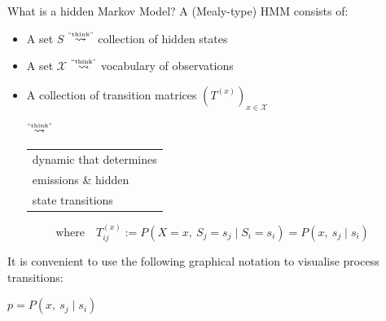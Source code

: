 \documentclass[aspectratio=169,11pt]{beamer}
\newcommand{\think}{\overset{\text{\tiny ``think''}}{\rightsquigarrow}}
\begin{document}
\begin{frame}{What is a hidden Markov Model?}
  \vspace{0.2em}
  A (Mealy-type) HMM consists of:
  \vspace{0.5em}
  \begin{itemize}
    \item[\textasteriskcentered] A set $S$ \quad $\think$ \quad collection of hidden states
    \vspace{0.3em}
    \item[\textasteriskcentered] A set $\mathcal{X}$ \quad $\think$ \quad vocabulary of observations
    \vspace{0.3em}
    \item[\textasteriskcentered] A collection of transition matrices
          $(T^{(x)})_{x\in\mathcal{X}}$
          \hfill
          {\scriptsize $\think$
           \begin{tabular}{@{}l@{}}dynamic that determines\\
                                   emissions \& hidden\\
                                   state transitions\end{tabular}}
  \end{itemize}
  \vspace{0.2em}
  \[
    \text{where}\quad
    T^{(x)}_{ij} := P\!\left(X=x,\ S_j=s_j \mid S_i=s_i\right)
                  = P\!\left(x,\ s_j \mid s_i\right)
  \]
  \vspace{-0.4em}

  It is convenient to use the following graphical notation to visualise
  process transitions:
  \begin{center}
    \figNotation
    \hspace{3em}
    $p = P(x,\ s_j \mid s_i)$
  \end{center}
\end{frame}
\end{document}
